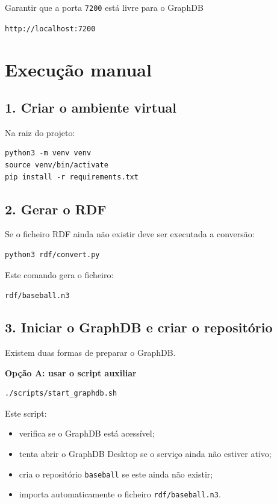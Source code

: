 Garantir que a porta \texttt{7200} est\'a livre para o GraphDB 
\begin{center}
\texttt{http://localhost:7200}
\end{center}

\section{Execu\c{c}\~ao manual}

\subsection{1. Criar o ambiente virtual}

Na raiz do projeto:

\begin{verbatim}
python3 -m venv venv
source venv/bin/activate
pip install -r requirements.txt
\end{verbatim}

\subsection{2. Gerar o RDF}

Se o ficheiro RDF ainda n\~ao existir deve ser executada a convers\~ao:

\begin{verbatim}
python3 rdf/convert.py
\end{verbatim}

Este comando gera o ficheiro:

\begin{center}
\texttt{rdf/baseball.n3}
\end{center}

\subsection{3. Iniciar o GraphDB e criar o reposit\'orio}

Existem duas formas de preparar o GraphDB.

\textbf{Op\c{c}\~ao A: usar o script auxiliar}

\begin{verbatim}
./scripts/start_graphdb.sh
\end{verbatim}

Este script:

\begin{itemize}[leftmargin=*]
  \item verifica se o GraphDB est\'a acess\'ivel;
  \item tenta abrir o GraphDB Desktop se o servi\c{c}o ainda n\~ao estiver ativo;
  \item cria o reposit\'orio \texttt{baseball} se este ainda n\~ao existir;
  \item importa automaticamente o ficheiro \texttt{rdf/baseball.n3}.
\end{itemize}

